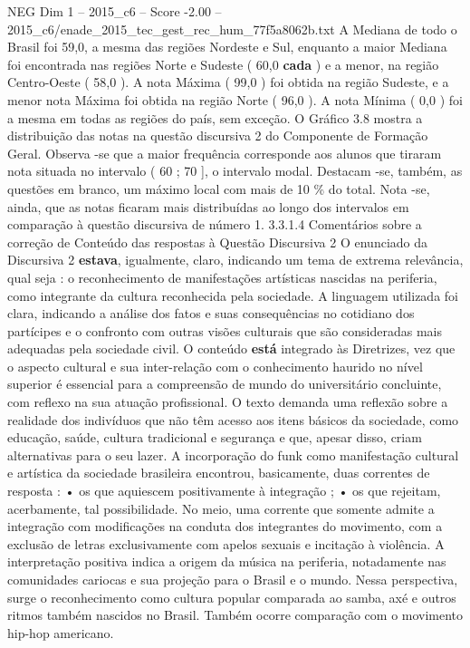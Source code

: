 \begin{textsample}{NEG Dim 1 – 2015\_c6 – Score -2.00 – 2015\_c6/enade\_2015\_tec\_gest\_rec\_hum\_77f5a8062b.txt}
A Mediana de todo o Brasil foi 59,0, a mesma das regiões Nordeste e Sul, enquanto a maior Mediana foi encontrada nas regiões Norte e Sudeste ( 60,0 \textbf{cada} ) e a menor, na região Centro-Oeste ( 58,0 ).
A nota Máxima ( 99,0 ) foi obtida na região Sudeste, e a menor nota Máxima foi obtida na região Norte ( 96,0 ).
A nota Mínima ( 0,0 ) foi a mesma em todas as regiões do país, sem exceção.
O Gráfico 3.8 mostra a distribuição das notas na questão discursiva 2 do Componente de Formação Geral.
Observa -se que a maior frequência corresponde aos alunos que tiraram nota situada no intervalo ( 60 ; 70 ], o intervalo modal.
Destacam -se, também, as questões em branco, um máximo local com mais de 10 \% do total.
Nota -se, ainda, que as notas ficaram mais distribuídas ao longo dos intervalos em comparação à questão discursiva de número 1. 3.3.1.4 Comentários sobre a correção de Conteúdo das respostas à Questão Discursiva 2 O enunciado da Discursiva 2 \textbf{estava}, igualmente, claro, indicando um tema de extrema relevância, qual seja : o reconhecimento de manifestações artísticas nascidas na periferia, como integrante da cultura reconhecida pela sociedade.
A linguagem utilizada foi clara, indicando a análise dos fatos e suas consequências no cotidiano dos partícipes e o confronto com outras visões culturais que são consideradas mais adequadas pela sociedade civil.
O conteúdo \textbf{está} integrado às Diretrizes, vez que o aspecto cultural e sua inter-relação com o conhecimento haurido no nível superior é essencial para a compreensão de mundo do universitário concluinte, com reflexo na sua atuação profissional.
O texto demanda uma reflexão sobre a realidade dos indivíduos que não têm acesso aos itens básicos da sociedade, como educação, saúde, cultura tradicional e segurança e que, apesar disso, criam alternativas para o seu lazer.
A incorporação do funk como manifestação cultural e artística da sociedade brasileira encontrou, basicamente, duas correntes de resposta : • os que aquiescem positivamente à integração ; • os que rejeitam, acerbamente, tal possibilidade.
No meio, uma corrente que somente admite a integração com modificações na conduta dos integrantes do movimento, com a exclusão de letras exclusivamente com apelos sexuais e incitação à violência.
A interpretação positiva indica a origem da música na periferia, notadamente nas comunidades cariocas e sua projeção para o Brasil e o mundo.
Nessa perspectiva, surge o reconhecimento como cultura popular comparada ao samba, axé e outros ritmos também nascidos no Brasil.
Também ocorre comparação com o movimento hip-hop americano.

\end{textsample}
